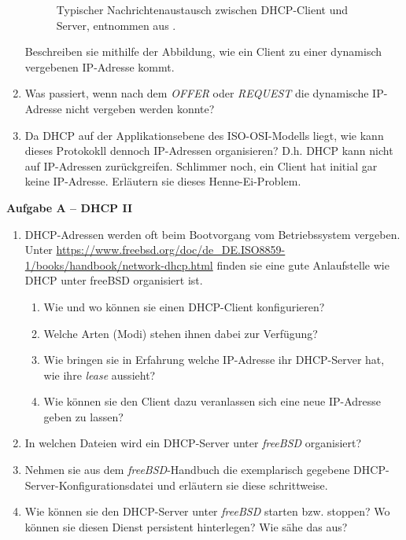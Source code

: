 \documentclass[paper=a4,fontsize=11pt]{scrartcl}%
\numberwithin{equation}{section}
\begin{document}
\begin{enumerate}
\begin{figure}[H]
	\caption{Typischer Nachrichtenaustausch zwischen DHCP-Client und Server, entnommen aus \cite[S. 240]{fall2011tcp}.}
	\label{dhcp_exchange}
	\end{figure}
	Beschreiben sie mithilfe der Abbildung, wie ein Client zu einer dynamisch vergebenen IP-Adresse kommt.
	\item Was passiert, wenn nach dem \emph{OFFER} oder \emph{REQUEST} die dynamische IP-Adresse nicht vergeben werden konnte?
	\item Da DHCP auf der Applikationsebene des ISO-OSI-Modells liegt, wie kann dieses Protokokll dennoch IP-Adressen organisieren? D.h. DHCP kann nicht auf IP-Adressen zurückgreifen. Schlimmer noch, ein Client hat initial gar keine IP-Adresse. Erläutern sie dieses Henne-Ei-Problem. 
\end{enumerate}

\begin{center}
\Large{\textbf{Aufgabe A -- DHCP II}}
\end{center}
\vskip0.25in

\begin{enumerate}
	\item DHCP-Adressen werden oft beim Bootvorgang vom Betriebssystem vergeben. Unter \url{https://www.freebsd.org/doc/de_DE.ISO8859-1/books/handbook/network-dhcp.html} finden sie eine gute Anlaufstelle wie DHCP unter freeBSD organisiert ist.
	\begin{enumerate}
		\item Wie und wo können sie einen DHCP-Client konfigurieren?
		\item Welche Arten (Modi) stehen ihnen dabei zur Verfügung?
		\item Wie bringen sie in Erfahrung welche IP-Adresse ihr DHCP-Server hat, wie ihre \emph{lease} aussieht?
		\item Wie können sie den Client dazu veranlassen sich eine neue IP-Adresse geben zu lassen?
	\end{enumerate}
	\item In welchen Dateien wird ein DHCP-Server unter \emph{freeBSD} organisiert?
	\item Nehmen sie aus dem \emph{freeBSD}-Handbuch die exemplarisch gegebene DHCP-Server-Konfigurationsdatei und erläutern sie diese schrittweise.
	\item Wie können sie den DHCP-Server unter \emph{freeBSD} starten bzw. stoppen? Wo können sie diesen Dienst persistent hinterlegen? Wie sähe das aus?
\end{enumerate}
\end{document}

